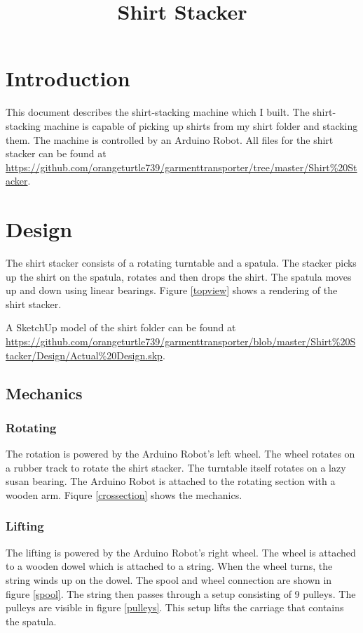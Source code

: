 \documentclass[12pt,letterpaper]{article}
\title{Shirt Stacker}
\author{}
\date{}
\begin{document}
\maketitle
\section{Introduction}
This document describes the shirt-stacking machine which I built. The shirt-stacking machine is capable of picking up shirts from my shirt folder and stacking them. The machine is controlled by an Arduino Robot. All files for the shirt stacker can be found at \url{https://github.com/orangeturtle739/garmenttransporter/tree/master/Shirt\%20Stacker}.

\section{Design}
The shirt stacker consists of a rotating turntable and a spatula. The stacker picks up the shirt on the spatula, rotates and then drops the shirt. The spatula moves up and down using linear bearings. Figure \ref{topview} shows a rendering of the shirt stacker.

A SketchUp model of the shirt folder can be found at \url{https://github.com/orangeturtle739/garmenttransporter/blob/master/Shirt\%20Stacker/Design/Actual%20Design.skp}.

\subsection{Mechanics}
\subsubsection{Rotating}
The rotation is powered by the Arduino Robot's left wheel. The wheel rotates on a rubber track to rotate the shirt stacker. The turntable itself rotates on a lazy susan bearing. The Arduino Robot is attached to the rotating section with a wooden arm. Fiqure \ref{crossection} shows the mechanics.

\subsubsection{Lifting}
The lifting is powered by the Arduino Robot's right wheel. The wheel is attached to a wooden dowel which is attached to a string. When the wheel turns, the string winds up on the dowel. The spool and wheel connection are shown in figure \ref{spool}. The string then passes through a setup consisting of 9 pulleys. The pulleys are visible in figure \ref{pulleys}. This setup lifts the carriage that contains the spatula.
\end{document}
